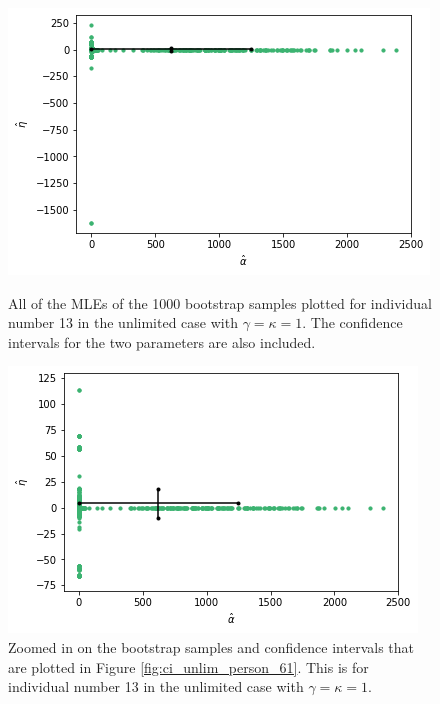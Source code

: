 \begin{figure}
    \centering
    \begin{minipage}{0.48\textwidth}
        \centering
        \includegraphics[scale=0.37]{pictures/ci_unlim_person13.png}
        \caption[MLEs of bootstrap samples individual 13, unlimited]{All of the MLEs of the 1000 bootstrap samples plotted for individual number 13 in the unlimited case with $\gamma=\kappa=1$. The confidence intervals for the two parameters are also included.}
        \label{fig:ci_unlim_person_13}
    \end{minipage}\hfill
    \begin{minipage}{0.48\textwidth}
        \centering
        \includegraphics[scale=0.37]{pictures/ci_unlim_person13_zoomed.png}
        \caption[MLEs of bootstrap samples individual 13, unlimited, zoomed]{Zoomed in on the bootstrap samples and confidence intervals that are plotted in Figure \ref{fig:ci_unlim_person_61}. This is for individual number 13 in the unlimited case with $\gamma=\kappa=1$.}
        \label{fig:ci_unlim_person_13_zoomed}
    \end{minipage}
\end{figure}
 


